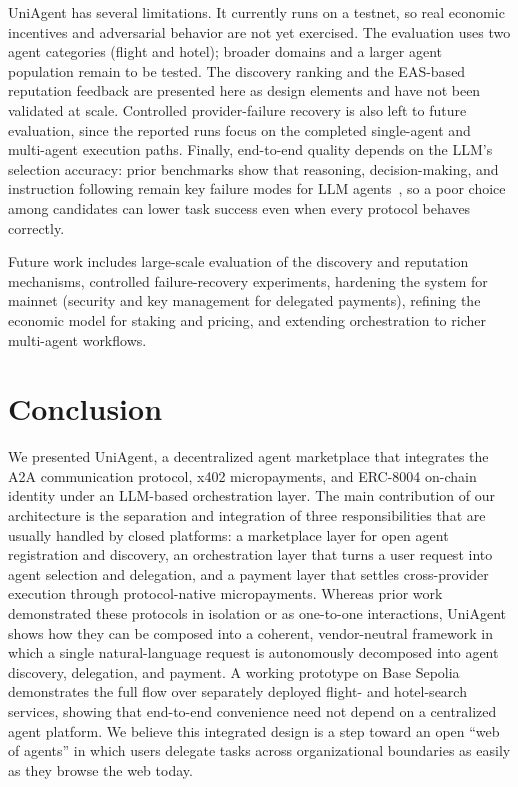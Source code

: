 \documentclass[sigconf]{acmart}
\begin{document}
UniAgent has several limitations. It currently runs on a testnet, so
real economic incentives and adversarial behavior are not yet exercised.
The evaluation uses two agent categories (flight and hotel); broader
domains and a larger agent population remain to be tested. The discovery
ranking and the EAS-based reputation feedback are presented here as
design elements and have not been validated at scale. Controlled
provider-failure recovery is also left to future evaluation, since the
reported runs focus on the completed single-agent and multi-agent
execution paths. Finally,
end-to-end quality depends on the LLM's selection accuracy: prior
benchmarks show that reasoning, decision-making, and instruction
following remain key failure modes for LLM
agents~\cite{liu2024agentbench}, so a poor choice among candidates can
lower task success even when every protocol behaves correctly.

Future work includes large-scale evaluation of the discovery and
reputation mechanisms, controlled failure-recovery experiments,
hardening the system for mainnet (security and key management for
delegated payments), refining the economic model for staking and
pricing, and extending orchestration to richer multi-agent workflows.

\section{Conclusion}
\label{sec:conclusion}

We presented UniAgent, a decentralized agent marketplace that integrates
the A2A communication protocol, x402 micropayments, and ERC-8004
on-chain identity under an LLM-based orchestration layer. The main
contribution of our architecture is the separation and integration of
three responsibilities that are usually handled by closed platforms: a
marketplace layer for open agent registration and discovery, an
orchestration layer that turns a user request into agent selection and
delegation, and a payment layer that settles cross-provider execution
through protocol-native micropayments. Whereas prior work demonstrated
these protocols in isolation or as one-to-one interactions, UniAgent
shows how they can be composed into a coherent, vendor-neutral framework
in which a single natural-language request is autonomously decomposed
into agent discovery, delegation, and payment. A working prototype on
Base Sepolia demonstrates the full flow over separately deployed flight-
and hotel-search services, showing that end-to-end convenience need not depend
on a centralized agent platform. We believe this integrated design is a
step toward an open ``web of agents'' in which users delegate tasks
across organizational boundaries as easily as they browse the web today.



\end{document}
